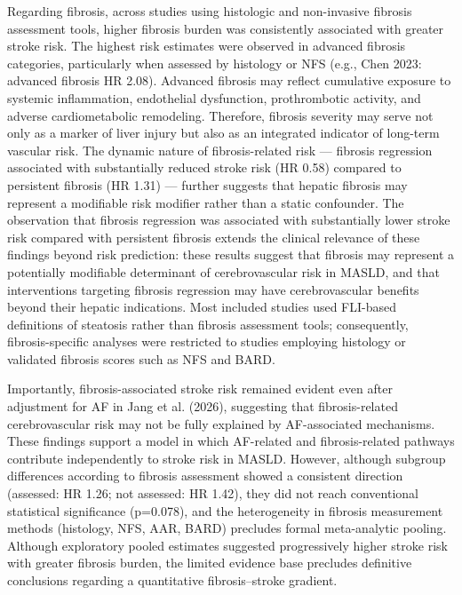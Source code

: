 \documentclass[12pt,a4paper]{article}
\begin{document}
Regarding fibrosis, across studies using histologic and non-invasive fibrosis assessment tools, higher fibrosis burden was consistently associated with greater stroke risk. The highest risk estimates were observed in advanced fibrosis categories, particularly when assessed by histology or NFS (e.g., Chen 2023: advanced fibrosis HR 2.08). Advanced fibrosis may reflect cumulative exposure to systemic inflammation, endothelial dysfunction, prothrombotic activity, and adverse cardiometabolic remodeling. Therefore, fibrosis severity may serve not only as a marker of liver injury but also as an integrated indicator of long-term vascular risk. The dynamic nature of fibrosis-related risk — fibrosis regression associated with substantially reduced stroke risk (HR 0.58) compared to persistent fibrosis (HR 1.31) — further suggests that hepatic fibrosis may represent a modifiable risk modifier rather than a static confounder. The observation that fibrosis regression was associated with substantially lower stroke risk compared with persistent fibrosis extends the clinical relevance of these findings beyond risk prediction: these results suggest that fibrosis may represent a potentially modifiable determinant of cerebrovascular risk in MASLD, and that interventions targeting fibrosis regression may have cerebrovascular benefits beyond their hepatic indications. Most included studies used FLI-based definitions of steatosis rather than fibrosis assessment tools; consequently, fibrosis-specific analyses were restricted to studies employing histology or validated fibrosis scores such as NFS and BARD.

Importantly, fibrosis-associated stroke risk remained evident even after adjustment for AF in Jang et al. (2026), suggesting that fibrosis-related cerebrovascular risk may not be fully explained by AF-associated mechanisms. These findings support a model in which AF-related and fibrosis-related pathways contribute independently to stroke risk in MASLD. However, although subgroup differences according to fibrosis assessment showed a consistent direction (assessed: HR 1.26; not assessed: HR 1.42), they did not reach conventional statistical significance (p=0.078), and the heterogeneity in fibrosis measurement methods (histology, NFS, AAR, BARD) precludes formal meta-analytic pooling. Although exploratory pooled estimates suggested progressively higher stroke risk with greater fibrosis burden, the limited evidence base precludes definitive conclusions regarding a quantitative fibrosis--stroke gradient.
\end{document}
